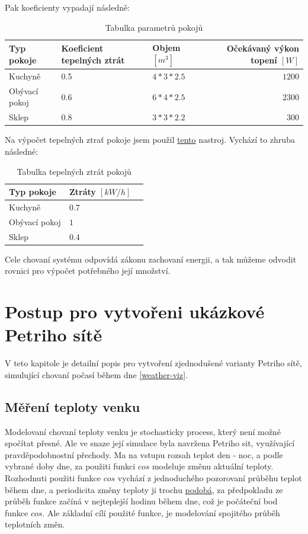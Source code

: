 Pak koeficienty vypadají následně:

\begin{table}[H]
	\vskip6pt
	\caption{Tabulka parametrů pokojů}
    \vskip6pt
	\centering
	\begin{tabular}{lllr}
		\toprule
		Typ pokoje & Koeficient tepelných ztrát & Objem $[m^3]$ & Očekávaný výkon topení $[W]$ \\
    \midrule
    Kuchyně & 0.5 & $4*3*2.5$ & $1200$ \\
    Obývací pokoj & 0.6 & $6*4*2.5$ & $2300$ \\
    Sklep & 0.8 & $3*3*2.2$ & $300$ \\
		\bottomrule
	\end{tabular}
	\label{tab:Parametry}
\end{table}

Na výpočet tepelných ztrať pokoje jsem použil \href{https://wpcalc.com/kalkulyator-teplopoter/}{tento} nastroj.
Vychází to zhruba následné:

\begin{table}[H]
	\vskip6pt
	\caption{Tabulka tepelných ztrát pokojů}
    \vskip6pt
	\centering
	\begin{tabular}{llr}
		\toprule
		Typ pokoje & Ztráty $[kW/h]$ \\
		\midrule
		Kuchyně & $0.7$ \\
    Obývací pokoj & $1$ \\
    Sklep & $0.4$ \\
		\bottomrule
	\end{tabular}
	\label{tab:TepelneZtraty}
\end{table}

Cele chovaní systému odpovídá zákonu zachovaní energii, a tak můžeme odvodit rovnici pro výpočet potřebného její množství.

\chapter{Postup pro vytvořeni ukázkové Petriho sítě}
\label{chap:postup}

V teto kapitole je detailní popis pro vytvoření zjednodušené varianty Petriho sítě, simulující chovaní počasí během dne \ref{weather-viz}.

\section{Měření teploty venku}
\label{sec:mereni-teploty}
Modelovaní chovaní teploty venku je stochasticky process, který není možné spočítat přesné. Ale ve snaze její simulace byla navržena Petriho sit, využívající pravděpodobnostní přechody. Ma na vstupu rozsah teplot den - noc, a podle vybrané doby dne, za použiti funkci $cos$ modeluje změnu aktuální teploty. Rozhodnuti použiti funkce $cos$ vychází z jednoduchého pozorovaní průběhu teplot během dne, a periodicita změny teploty ji trochu \href{https://forecast.weather.gov/MapClick.php?lat=42.3758&lon=-71.1187&lg=english&FcstType=graphical}{podobá}, za předpokladu ze průběh funkce začíná v nejteplejší hodinu během dne, což je počáteční bod funkce $cos$. Ale základní cílí použité funkce, je modelování spojitého průběh teplotních změn.

